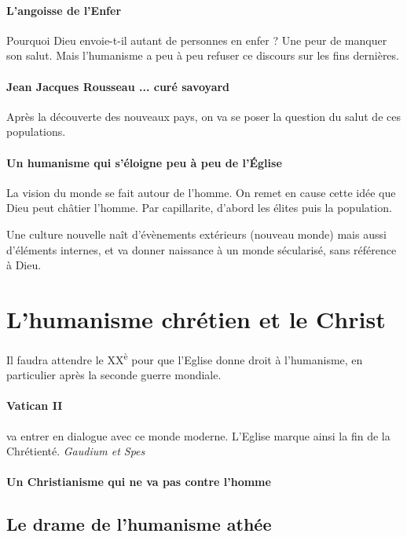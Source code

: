  
\paragraph{L'angoisse de l'Enfer} Pourquoi Dieu envoie-t-il autant de personnes en enfer ? Une peur de manquer son salut. Mais l'humanisme a peu à peu refuser ce discours sur les fins dernières.

\paragraph{Jean Jacques Rousseau ... curé savoyard} Après la découverte des nouveaux pays, on va se poser la question du salut de ces populations.

\paragraph{Un humanisme qui s'éloigne peu à peu de l'Église} La vision du monde se fait autour de l'homme. On remet en cause cette idée que Dieu peut châtier l'homme. Par capillarite, d'abord les élites puis la population.

\begin{Synthesis}
Une culture nouvelle naît d'évènements extérieurs (nouveau monde) mais aussi d'éléments internes, et va donner naissance à un monde sécularisé, sans référence à Dieu.
\end{Synthesis}

\section{L’humanisme chrétien et le Christ }

Il faudra attendre le XX\textsuperscript{è} pour que l'Eglise donne droit à l'humanisme, en particulier après la seconde guerre mondiale.
\paragraph{Vatican II} va entrer en dialogue avec ce monde moderne. L'Eglise marque ainsi la fin de la Chrétienté. \textit{Gaudium et Spes}

\paragraph{Un Christianisme qui ne va pas contre l'homme}

\subsection{Le drame de l’humanisme athée} 
